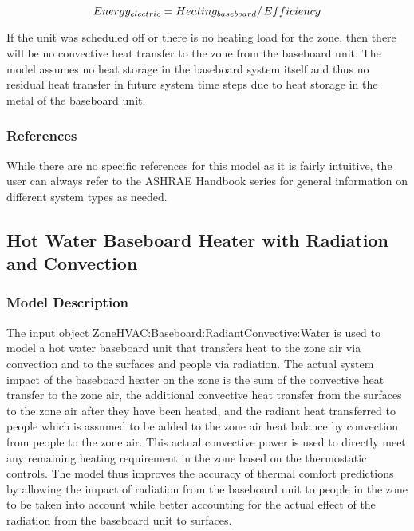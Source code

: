 \begin{equation}
Energ{y_{electric}} = {{Heatin{g_{baseboard}}} \mathord{\left/ {\vphantom {{Heatin{g_{baseboard}}} {Efficiency}}} \right. } {Efficiency}}
\end{equation}

If the unit was scheduled off or there is no heating load for the zone, then there will be no convective heat transfer to the zone from the baseboard unit. The model assumes no heat storage in the baseboard system itself and thus no residual heat transfer in future system time steps due to heat storage in the metal of the baseboard unit.

\subsubsection{References}\label{references-1-002}

While there are no specific references for this model as it is fairly intuitive, the user can always refer to the ASHRAE Handbook series for general information on different system types as needed.

\subsection{Hot Water Baseboard Heater with Radiation and Convection}\label{hot-water-baseboard-heater-with-radiation-and-convection}

\subsubsection{Model Description}\label{model-description-2-002}

The input object ZoneHVAC:Baseboard:RadiantConvective:Water is used to model a hot water baseboard unit that transfers heat to the zone air via convection and to the surfaces and people via radiation. The actual system impact of the baseboard heater on the zone is the sum of the convective heat transfer to the zone air, the additional convective heat transfer from the surfaces to the zone air after they have been heated, and the radiant heat transferred to people which is assumed to be added to the zone air heat balance by convection from people to the zone air. This actual convective power is used to directly meet any remaining heating requirement in the zone based on the thermostatic controls. The model thus improves the accuracy of thermal comfort predictions by allowing the impact of radiation from the baseboard unit to people in the zone to be taken into account while better accounting for the actual effect of the radiation from the baseboard unit to surfaces.

